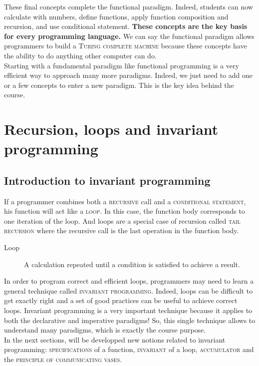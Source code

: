 \documentclass[11pt,a4paper,twoside,openright]{report}
\begin{document}
These final concepts complete the functional paradigm. Indeed, students can now 
calculate with numbers, define functions, apply function composition and 
recursion, and use conditional statement. \textbf{These concepts are the key 
basis for every programming language.} We can say the functional paradigm 
allows programmers to build a \textsc{Turing complete machine} because these 
concepts have the ability to do anything other computer can do.\\

Starting with a fundamental paradigm like functional programming is a very 
efficient way to approach many more paradigms. Indeed, we just need to add one 
or a few concepts to enter a new paradigm. This is the key idea behind the 
course.

\section{Recursion, loops and invariant programming}

\subsection{Introduction to invariant programming}

If a programmer combines both a \textsc{recursive} call and a 
\textsc{conditional statement}, his function will act like a \textsc{loop}.  In 
this case, the function body corresponds to one iteration of the loop. And 
loops are a special case of recursion called \textsc{tail recursion} where the 
recursive call is the last operation in the function body.

\begin{description}
 \item[Loop] A calculation repeated until a condition is satisfied to achieve a 
result. 
\end{description}

In order to program correct and efficient loops, programmers may need to learn 
a general technique called \textsc{invariant programming}. Indeed, loops can be 
	difficult to get exactly right and a set of good practices can be 
useful 
to achieve correct loops. Invariant programming is a very important technique 
because it applies to both the declarative and imperative paradigms! So, this 
single technique allows to understand many paradigms, which is exactly the 
course purpose.\\

In the next sections, will be developped new notions related to invariant 
programming: \textsc{specifications} of a function, \textsc{invariant} of a 
loop, \textsc{accumulator} and the \textsc{principle of communicating vases}.
\end{document}
